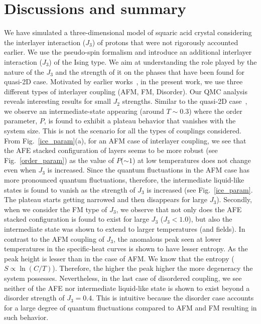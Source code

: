 \section{Discussions and summary}
\label{discussion}
\indent \indent We have simulated a three-dimensional model of squaric acid crystal considering the interlayer interaction ($J_3$) of protons that were not rigorously accounted earlier. We use the pseudo-spin formalism and introduce an additional interlayer interaction ($J_3$) of the Ising type. We aim at understanding the role played by the nature of the $J_3$ and the strength of it on the phases that have been found for quasi-2D case. Motivated by earlier works~\cite{matsushita1982cluster}, in the present work, we use three different types of interlayer coupling (AFM, FM, Disorder). Our QMC analysis reveals interesting results for small $J_2$ strengths. Similar to the quasi-2D case~\cite{ishizuka2011quantum,vijigiri2020dipole}, we observe an intermediate-state appearing (around $T\sim 0.3$) where the order parameter, $P$, is found to exhibit a plateau behavior that vanishes with the system size. This is not the scenario for all the types of couplings considered. From Fig.~\ref{ice_param}(a), for an AFM case of interlayer coupling, we see that the AFE stacked configuration of layers seems to be more robust (see Fig.~\ref{order_param}) as the value of $P$($\sim 1$) at low temperatures does not change even when $J_3$ is increased. Since the quantum fluctuations in the AFM case has more pronounced quantum fluctuations, therefore, the intermediate liquid-like states is found to vanish as the strength of $J_3$ is increased (see Fig.~\ref{ice_param}. The plateau starts getting narrowed and then disappears for large $J_3$). Secondly, when we consider the FM type of $J_3$, we observe that not only does the AFE stacked configuration is found to exist for large $J_3$ ($J_3<1.0$), but also the intermediate state was shown to extend to larger temperatures (and fields). In contrast to the AFM coupling of $J_3$, the anomalous peak seen at lower temperatures in the specific-heat curves is shown to have lesser entropy. As the peak height is lesser than in the case of AFM. We know that the entropy ($S\propto \ln(C/T) $). Therefore, the higher the peak higher the more degeneracy the system possesses. Nevertheless, in the last case of disordered coupling, we see neither of the AFE nor intermediate liquid-like state is shown to exist beyond a disorder strength of $J_3=0.4$. This is intuitive because the disorder case accounts for a large degree of quantum fluctuations compared to AFM and FM resulting in such behavior. \\
